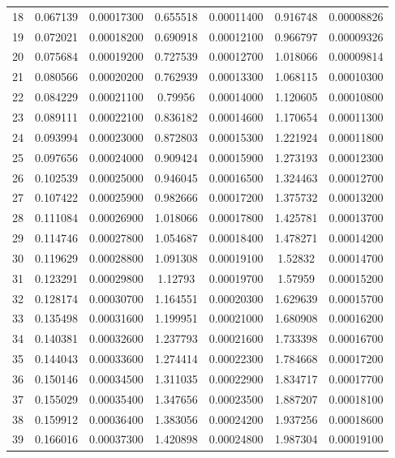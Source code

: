 \begin{table}[h]
{\begin{tabular}{ccccccc}
	18     & 0.067139 & 0.00017300 & 0.655518 & 0.00011400 & 0.916748 & 0.00008826 \\
	19     & 0.072021 & 0.00018200 & 0.690918 & 0.00012100 & 0.966797 & 0.00009326 \\
	20     & 0.075684 & 0.00019200 & 0.727539 & 0.00012700 & 1.018066 & 0.00009814 \\
	21     & 0.080566 & 0.00020200 & 0.762939 & 0.00013300 & 1.068115 & 0.00010300 \\
	22     & 0.084229 & 0.00021100 & 0.79956  & 0.00014000 & 1.120605 & 0.00010800 \\
	23     & 0.089111 & 0.00022100 & 0.836182 & 0.00014600 & 1.170654 & 0.00011300 \\
	24     & 0.093994 & 0.00023000 & 0.872803 & 0.00015300 & 1.221924 & 0.00011800 \\
	25     & 0.097656 & 0.00024000 & 0.909424 & 0.00015900 & 1.273193 & 0.00012300 \\
	26     & 0.102539 & 0.00025000 & 0.946045 & 0.00016500 & 1.324463 & 0.00012700 \\
	27     & 0.107422 & 0.00025900 & 0.982666 & 0.00017200 & 1.375732 & 0.00013200 \\
	28     & 0.111084 & 0.00026900 & 1.018066 & 0.00017800 & 1.425781 & 0.00013700 \\
	29     & 0.114746 & 0.00027800 & 1.054687 & 0.00018400 & 1.478271 & 0.00014200 \\
	30     & 0.119629 & 0.00028800 & 1.091308 & 0.00019100 & 1.52832  & 0.00014700 \\
  	31     & 0.123291 & 0.00029800 & 1.12793  & 0.00019700 & 1.57959  & 0.00015200 \\
	32     & 0.128174 & 0.00030700 & 1.164551 & 0.00020300 & 1.629639 & 0.00015700 \\
 	33     & 0.135498 & 0.00031600 & 1.199951 & 0.00021000 & 1.680908 & 0.00016200 \\
 	34     & 0.140381 & 0.00032600 & 1.237793 & 0.00021600 & 1.733398 & 0.00016700 \\
 	35     & 0.144043 & 0.00033600 & 1.274414 & 0.00022300 & 1.784668 & 0.00017200 \\
 	36     & 0.150146 & 0.00034500 & 1.311035 & 0.00022900 & 1.834717 & 0.00017700 \\
 	37     & 0.155029 & 0.00035400 & 1.347656 & 0.00023500 & 1.887207 & 0.00018100 \\
	38     & 0.159912 & 0.00036400 & 1.383056 & 0.00024200 & 1.937256 & 0.00018600 \\
 	39     & 0.166016 & 0.00037300 & 1.420898 & 0.00024800 & 1.987304 & 0.00019100 \\

\end{tabular}}
\end{table}
